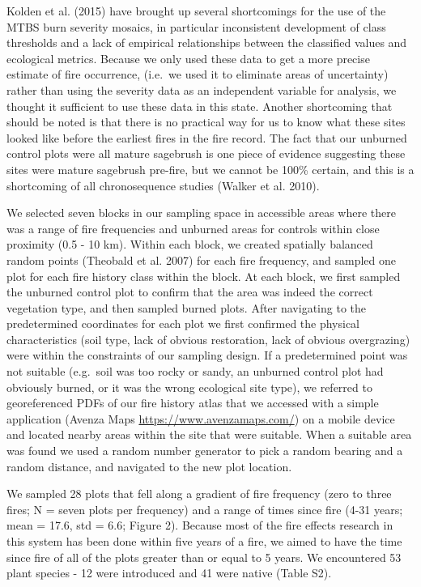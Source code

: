 \documentclass[12pt,]{article}
\begin{document}
Kolden et al. (2015) have brought up several shortcomings for the use of
the MTBS burn severity mosaics, in particular inconsistent development
of class thresholds and a lack of empirical relationships between the
classified values and ecological metrics. Because we only used these
data to get a more precise estimate of fire occurrence, (i.e.~we used it
to eliminate areas of uncertainty) rather than using the severity data
as an independent variable for analysis, we thought it sufficient to use
these data in this state. Another shortcoming that should be noted is
that there is no practical way for us to know what these sites looked
like before the earliest fires in the fire record. The fact that our
unburned control plots were all mature sagebrush is one piece of
evidence suggesting these sites were mature sagebrush pre-fire, but we
cannot be 100\% certain, and this is a shortcoming of all chronosequence
studies (Walker et al. 2010).

We selected seven blocks in our sampling space in accessible areas where
there was a range of fire frequencies and unburned areas for controls
within close proximity (0.5 - 10 km). Within each block, we created
spatially balanced random points (Theobald et al. 2007) for each fire
frequency, and sampled one plot for each fire history class within the
block. At each block, we first sampled the unburned control plot to
confirm that the area was indeed the correct vegetation type, and then
sampled burned plots. After navigating to the predetermined coordinates
for each plot we first confirmed the physical characteristics (soil
type, lack of obvious restoration, lack of obvious overgrazing) were
within the constraints of our sampling design. If a predetermined point
was not suitable (e.g.~soil was too rocky or sandy, an unburned control
plot had obviously burned, or it was the wrong ecological site type), we
referred to georeferenced PDFs of our fire history atlas that we
accessed with a simple application (Avenza Maps
\url{https://www.avenzamaps.com/}) on a mobile device and located nearby
areas within the site that were suitable. When a suitable area was found
we used a random number generator to pick a random bearing and a random
distance, and navigated to the new plot location.

We sampled 28 plots that fell along a gradient of fire frequency (zero
to three fires; N = seven plots per frequency) and a range of times
since fire (4-31 years; mean = 17.6, std = 6.6; Figure 2). Because most
of the fire effects research in this system has been done within five
years of a fire, we aimed to have the time since fire of all of the
plots greater than or equal to 5 years. We encountered 53 plant species
- 12 were introduced and 41 were native (Table S2).
\end{document}
